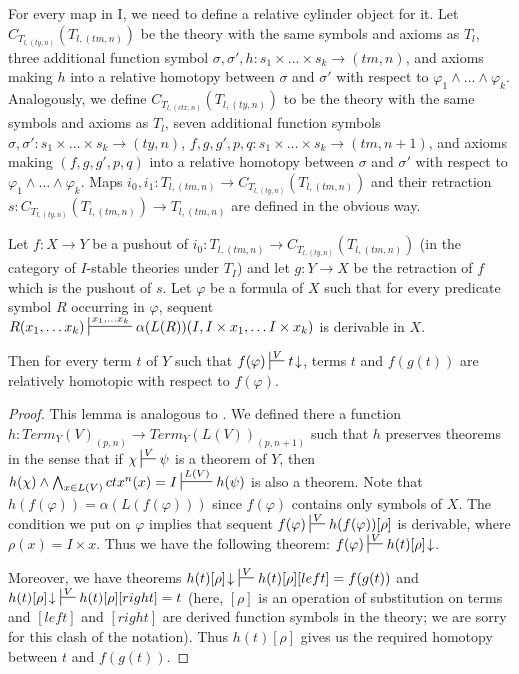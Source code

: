 \documentclass[reqno]{amsart}
\theoremstyle{definition}
\theoremstyle{remark}
\newcommand{\I}{\mathrm{I}}
\newcommand{\cyli}{i}
\numberwithin{figure}{section}
\begin{document}
For every map in $\I$, we need to define a relative cylinder object for it.
Let $C_{T_{l,(ty,n)}}(T_{l,(tm,n)})$ be the theory with the same symbols and axioms as $T_l$,
three additional function symbol $\sigma, \sigma', h : s_1 \times \ldots \times s_k \to (tm,n)$,
and axioms making $h$ into a relative homotopy between $\sigma$ and $\sigma'$ with respect to $\varphi_1 \land \ldots \land \varphi_k$.
Analogously, we define $C_{T_{l,(ctx,n)}}(T_{l,(ty,n)})$ to be the theory with the same symbols and axioms as $T_l$,
seven additional function symbols $\sigma,\sigma' : s_1 \times \ldots \times s_k \to (ty,n)$, $f,g,g',p,q : s_1 \times \ldots \times s_k \to (tm,n+1)$,
and axioms making $(f,g,g',p,q)$ into a relative homotopy between $\sigma$ and $\sigma'$ with respect to $\varphi_1 \land \ldots \land \varphi_k$.
Maps $\cyli_0,\cyli_1 : T_{l,(tm,n)} \to C_{T_{l,(ty,n)}}(T_{l,(tm,n)})$ and their retraction
$s : C_{T_{l,(ty,n)}}(T_{l,(tm,n)}) \to T_{l,(tm,n)}$ are defined in the obvious way.

\begin{lem}
Let $f : X \to Y$ be a pushout of $\cyli_0 : T_{l,(tm,n)} \to C_{T_{l,(ty,n)}}(T_{l,(tm,n)})$ (in the category of $I$-stable theories under $T_I$)
and let $g : Y \to X$ be the retraction of $f$ which is the pushout of $s$.
Let $\varphi$ be a formula of $X$ such that for every predicate symbol $R$ occurring in $\varphi$,
sequent $R(x_1, \ldots x_k) \sststile{}{x_1, \ldots x_k} \alpha(L(R))(I, I \times x_1, \ldots I \times x_k)$ is derivable in $X$.

Then for every term $t$ of $Y$ such that $f(\varphi) \sststile{}{V} t\!\downarrow$, terms $t$ and $f(g(t))$ are relatively homotopic with respect to $f(\varphi)$.
\end{lem}
\begin{proof}
This lemma is analogous to \cite[Lemma~3.7]{alg-models}.
We defined there a function $h : Term_Y(V)_{(p,n)} \to Term_Y(L(V))_{(p,n+1)}$ such that $h$ preserves theorems in the sense that
if $\chi \sststile{}{V} \psi$ is a theorem of $Y$, then $h(\chi) \land \bigwedge_{x \in L(V)} ctx^n(x) = I \sststile{}{L(V)} h(\psi)$ is also a theorem.
Note that $h(f(\varphi)) = \alpha(L(f(\varphi)))$ since $f(\varphi)$ contains only symbols of $X$.
The condition we put on $\varphi$ implies that sequent $f(\varphi) \sststile{}{V} h(f(\varphi))[\rho]$ is derivable, where $\rho(x) = I \times x$.
Thus we have the following theorem: $f(\varphi) \sststile{}{V} h(t)[\rho]\!\downarrow$.

Moreover, we have theorems $h(t)[\rho]\!\downarrow\ \sststile{}{V} h(t)[\rho][left] = f(g(t))$ and $h(t)[\rho]\!\downarrow\ \sststile{}{V} h(t)[\rho][right] = t$
(here, $[\rho]$ is an operation of substitution on terms and $[left]$ and $[right]$ are derived function symbols in the theory; we are sorry for this clash of the notation).
Thus $h(t)[\rho]$ gives us the required homotopy between $t$ and $f(g(t))$.
\end{proof}
\end{document}
